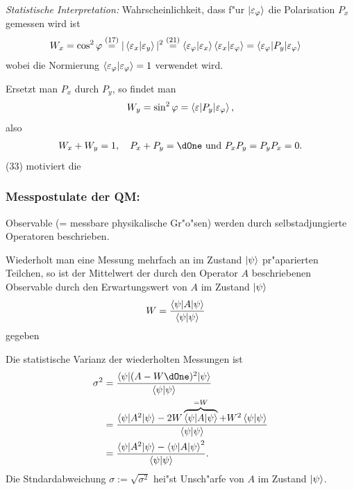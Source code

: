 \documentclass[a4paper]{scrartcl}
\begin{document}
{\begin{center}
\end{center}
\emph{Statistische Interpretation:} Wahrscheinlichkeit, dass f"ur $\ket{ \varepsilon_\varphi}$ die Polarisation $P_x$ gemessen wird ist 
\begin{align}
W_x & = \cos^2 \varphi 
 \stackrel{(17)}= | \braket {\varepsilon_x | \varepsilon_y } |^2 
 \stackrel{(21)}= \braket{ \varepsilon_\varphi | \varepsilon_x} \braket{ \varepsilon_x | \varepsilon_\varphi} 
 = \braket{ \varepsilon_\varphi | P_y | \varepsilon_\varphi}
\end{align}
wobei die Normierung $\braket{ \varepsilon_\varphi | \varepsilon_\varphi } = 1$ verwendet wird.

Ersetzt man $P_x$ durch $P_y$, so findet man 
\begin{align}
W_y = \sin^2 \varphi = \braket{ \varepsilon | P_y | \varepsilon_\varphi},
\end{align}
also
\begin{align}
W_x + W_y = 1, \quad P_x + P_y = \dOne \ \mathrm{und} \ P_xP_y = P_yP_x = 0.
\end{align}
(33) motiviert die 

\subsubsection*{Messpostulate der QM:}

\begin{iaufz}
\item Observable (= messbare physikalische Gr"o"sen) werden durch selbstadjungierte Operatoren beschrieben.
\item Wiederholt man eine Messung mehrfach an im Zustand $\ket \psi$ pr"aparierten Teilchen, so ist der Mittelwert der durch den Operator $A$ beschriebenen Observable durch den Erwartungswert von $A$ im Zustand $\ket \psi$
\begin{align}
W & = \frac{ \braket{ \psi | A | \psi }}{ \braket { \psi | \psi }}
\end{align}
gegeben
\item Die statistische Varianz der wiederholten Messungen ist
\begin{align}
\begin{split}
\sigma^2 & = 
\frac{ 
\braket{ \psi | (A - W \dOne)^2 | \psi }}
{ \braket{ \psi | \psi }} \\
& = 
\frac{ 
\braket{ \psi | A^2 | \psi} - 2 W \overbrace{ \braket{ \psi | A | \psi }}^{=W} + W^2 \braket{ \psi | \psi}}{\braket{ \psi | \psi}} \\
& = \frac{ \braket{ \psi | A^2 | \psi } - \braket{ \psi | A | \psi }^2}{\braket{ \psi | \psi }}.
\end{split}
\end{align}
Die Stndardabweichung $\sigma := \sqrt {\sigma^2}$ hei"st Unsch"arfe von $A$ im Zustand $\ket \psi$.


\end{iaufz}}
\end{document}
